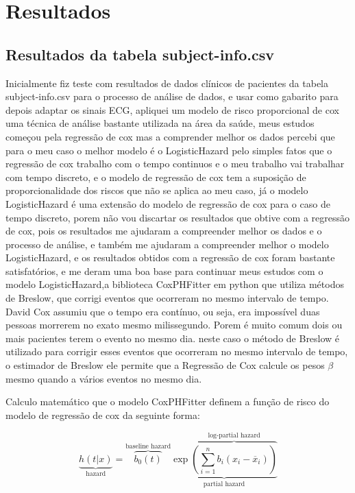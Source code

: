 \chapter{Resultados}
\label{chap:resultados}

\section{Resultados da tabela subject-info.csv}

Inicialmente fiz teste com resultados de dados clínicos de pacientes da tabela subject-info.csv \cite{physionet2020music_dataset} para o processo de análise de dados, e usar como gabarito para depois adaptar os sinais ECG, apliquei um modelo de risco proporcional de cox uma técnica de análise bastante utilizada na área da saúde, meus estudos começou pela regressão de cox mas a comprender melhor os dados percebi que para o meu caso o melhor modelo é o LogisticHazard pelo simples fatos que o regressão de cox trabalho com o tempo continuos e o meu trabalho vai trabalhar com tempo discreto, e o modelo de regressão de cox tem a suposição de proporcionalidade dos riscos que não se aplica ao meu caso, já o modelo LogisticHazard é uma extensão do modelo de regressão de cox para o caso de tempo discreto, porem não vou discartar os resultados que obtive com a regressão de cox, pois os resultados me ajudaram a compreender melhor os dados e o processo de análise, e também me ajudaram a compreender melhor o modelo LogisticHazard, e os resultados obtidos com a regressão de cox foram bastante satisfatórios, e me deram uma boa base para continuar meus estudos com o modelo LogisticHazard,a biblioteca  CoxPHFitter em python  \cite{kvamme2019time} \cite{lifelines_docs_cox} que utiliza métodos de Breslow, que corrigi eventos que ocorreram no mesmo intervalo de tempo. David Cox assumiu que o tempo era contínuo, ou seja, era impossível duas pessoas morrerem no exato mesmo milissegundo. Porem é muito comum dois ou mais pacientes terem o evento no mesmo dia. neste caso o método de Breslow é utilizado para corrigir esses eventos que ocorreram no mesmo intervalo de tempo, o estimador de Breslow ele permite que a Regressão de Cox calcule os pesos $\beta$ mesmo quando a vários eventos no mesmo dia.

Calculo matemático que o modelo CoxPHFitter \cite{lifelines_docs_cox} definem a função de risco do modelo de regressão de cox da seguinte forma:

\begin{equation}
	\label{eq:cox_hazard_eng}
	\underbrace{h(t|x)}_{\text{hazard}} = \overbrace{b_0(t)}^{\text{baseline hazard}} \underbrace{\exp \overbrace{\left( \sum_{i=1}^n b_i(x_i - \overline{x}_i) \right)}^{\text{log-partial hazard}}}_{\text{partial hazard}}
\end{equation}



